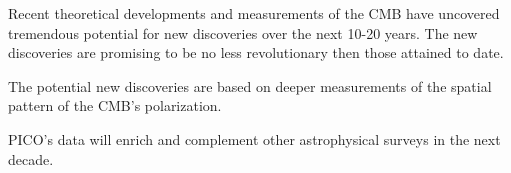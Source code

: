 \documentclass[PICOReport.tex]{subfiles}
\begin{document}
Recent theoretical developments and measurements of the \ac{CMB} have uncovered tremendous potential for new discoveries over the next 10-20 years. The new discoveries are promising to be no less revolutionary then those attained to date. 

The potential new discoveries are based on deeper measurements of the spatial pattern of the CMB's polarization.


PICO's data will enrich and complement other astrophysical surveys in the next decade.
\end{document}
